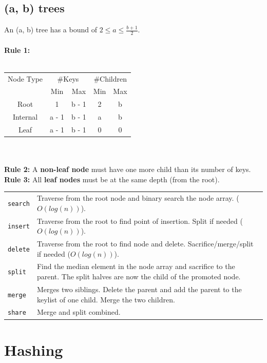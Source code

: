 \documentclass[10pt,landscape,a4paper]{article}
\begin{document}
\begin{multicols*}{4}
\subsection{(a, b) trees}
An (a, b) tree has a bound of $2 \le a \le \frac{b+1}{2}$.\\\\
\textbf{Rule 1:}\\\\
\begin{tabular}{c|c|c|c|c}
    Node Type   &   \multicolumn{2}{|c|}{\#Keys} &  \multicolumn{2}{|c}{\#Children} \\
    {}          &   Min     &   Max            &    Min     &   Max \\
    \hline
    Root        &   1       &   b - 1           &   2       &   b   \\
    \hline
    Internal    &   a - 1   &   b - 1           &   a       &   b   \\
    \hline
    Leaf        &   a - 1   &   b - 1           &   0       &   0   \\
\end{tabular} \\\\
\textbf{Rule 2:} A \textbf{non-leaf node} must have one more child than its number of keys. \\
\textbf{Rule 3:} All \textbf{leaf nodes} must be at the same depth (from the root). \\
\begin{tabular}{p{0.6cm} p{5.4cm}}
    \verb!search!   & Traverse from the root node and binary search the node array. ($O(log(n))$).\\
    \verb!insert!   & Traverse from the root to find point of insertion. Split if needed ($O(log(n))$).  \\
    \verb!delete!   & Traverse from the root to find node and delete. Sacrifice/merge/split if needed ($O(log(n))$). \\
    \verb!split!    & Find the median element in the node array and sacrifice to the parent. The split halves are now the child of the promoted node. \\
    \verb!merge!    & Merges two siblings. Delete the parent and add the parent to the keylist of one child. Merge the two children. \\
    \verb!share!    & Merge and split combined. \\
\end{tabular}

\section{Hashing}


\end{multicols*}
\end{document}
